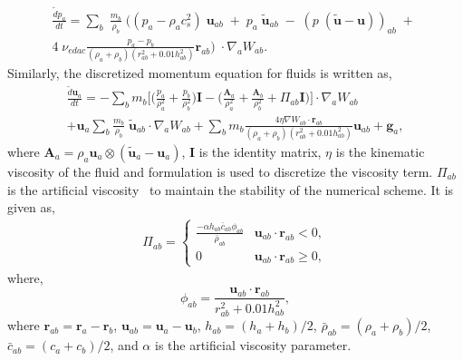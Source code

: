 \documentclass[preprint,12pt]{elsarticle}
\newcommand{\ten}[1]{\ensuremath{\mathbf{#1}}}
\begin{document}
\begin{multline}
  \label{eq:sph-discretization-edac}
  \frac{\tilde{d}p_a}{dt} = \sum_{b} \; \frac{m_b}{\rho_{b}} \; \bigg(
  (p_{a} - \rho_{a} c_{s}^2) \; \ten{u}_{ab} \; + \;
  p_{a} \; \tilde{\ten{u}}_{ab} \; - \;
  (p \; (\tilde{\ten{u}} - \ten{u}))_{ab} \; + \; \\
  4 \; \nu_{edac}
  \frac{p_a - p_b}{(\rho_a + \rho_b) (r^2_{ab} + 0.01 h_{ab}^{2})} \ten{r}_{ab}
  \bigg) \; \cdot \nabla_{a} W_{ab}.
\end{multline}
%
Similarly, the discretized momentum equation for fluids is written as,
\begin{multline}
  \label{eq:sph-momentum-fluid}
  \frac{\tilde{d}\ten{u}_{a}}{dt} = - \sum_{b} m_b \bigg[
  \bigg(\frac{p_a}{\rho_a^2} + \frac{p_b}{\rho_b^2}\bigg) \ten{I} -
  \bigg(\frac{\ten{A}_a}{\rho_a^2} + \frac{\ten{A}_b}{\rho_b^2} + \Pi_{ab}
  \ten{I} \bigg) \bigg]
  \cdot \nabla_{a} W_{ab} \\
  + \ten{u}_{a} \sum_{b} \frac{m_b}{\rho_{b}} \; \tilde{\ten{u}}_{ab} \cdot
  \nabla_{a} W_{ab} + \sum_{b} m_b \frac{4 \eta \nabla W_{ab}\cdot
    \ten{r}_{ab}}{(\rho_a + \rho_b) (r_{ab}^2 + 0.01 h_{ab}^2)} \ten{u}_{ab} +
  \ten{g}_{a},
\end{multline}
where $\ten{A}_a = \rho_a \ten{u}_a \otimes (\ten{\tilde{u}}_a - \ten{u}_a)$,
$\ten{I}$ is the identity matrix, $\eta$ is the kinematic viscosity of the
fluid and \citet{morris1997modeling} formulation is used to discretize the
viscosity term. $\Pi_{ab}$ is the artificial
viscosity~\cite{monaghan-review:2005} to maintain the stability of the
numerical scheme. It is given as,
\begin{align}
  \label{eq:mom-av}
  \Pi_{ab} =
  \begin{cases}
\frac{-\alpha h_{ab} \bar{c}_{ab} \phi_{ab}}{\bar{\rho}_{ab}}
  & \ten{u}_{ab}\cdot \ten{r}_{ab} < 0, \\
  0 & \ten{u}_{ab}\cdot \ten{r}_{ab} \ge 0,
\end{cases}
\end{align}
where,
%
\begin{equation}
  \label{eq:av-phiij}
  \phi_{ab} = \frac{\ten{u}_{ab} \cdot \ten{r}_{ab}}{r^2_{ab} + 0.01 h^2_{ab}},
\end{equation}
%
where $\ten{r}_{ab} = \ten{r}_a - \ten{r}_b$, $\ten{u}_{ab} = \ten{u}_a -
\ten{u}_b$, $h_{ab} = (h_a + h_b)/2$, $\bar{\rho}_{ab} = (\rho_a + \rho_b)/2$,
$\bar{c}_{ab} = (c_a + c_b) / 2$, and $\alpha$ is the artificial
viscosity parameter.
\end{document}
